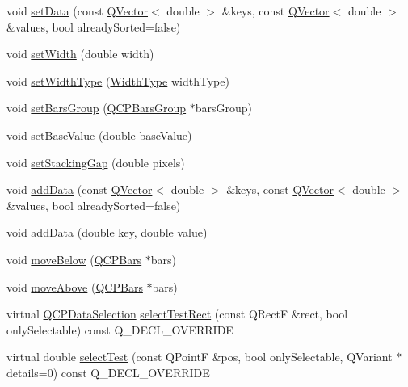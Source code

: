 \begin{DoxyCompactItemize}
\item 
void \hyperlink{class_q_c_p_bars_a2a88cd5b16ec7b71e5a590f95b50c5ce}{set\+Data} (const \hyperlink{class_q_vector}{Q\+Vector}$<$ double $>$ \&keys, const \hyperlink{class_q_vector}{Q\+Vector}$<$ double $>$ \&values, bool already\+Sorted=false)
\item 
void \hyperlink{class_q_c_p_bars_afec6116579d44d5b706e0fa5e5332507}{set\+Width} (double width)
\item 
void \hyperlink{class_q_c_p_bars_adcaa3b41281bb2c0f7949b341592fcc0}{set\+Width\+Type} (\hyperlink{class_q_c_p_bars_a65dbbf1ab41cbe993d71521096ed4649}{Width\+Type} width\+Type)
\item 
void \hyperlink{class_q_c_p_bars_aedd1709061f0b307c47ddb45e172ef9a}{set\+Bars\+Group} (\hyperlink{class_q_c_p_bars_group}{Q\+C\+P\+Bars\+Group} $\ast$bars\+Group)
\item 
void \hyperlink{class_q_c_p_bars_a574ec7eb7537566df1a28ff085d75623}{set\+Base\+Value} (double base\+Value)
\item 
void \hyperlink{class_q_c_p_bars_aeacf7561afb1c70284b22822b57c7bb5}{set\+Stacking\+Gap} (double pixels)
\item 
void \hyperlink{class_q_c_p_bars_a323d6970d6d6e3166d89916a7f60f733}{add\+Data} (const \hyperlink{class_q_vector}{Q\+Vector}$<$ double $>$ \&keys, const \hyperlink{class_q_vector}{Q\+Vector}$<$ double $>$ \&values, bool already\+Sorted=false)
\item 
void \hyperlink{class_q_c_p_bars_a684dd105403a5497fda42f2094fecbb7}{add\+Data} (double key, double value)
\item 
void \hyperlink{class_q_c_p_bars_a69fc371346980f19177c3d1ecdad78ee}{move\+Below} (\hyperlink{class_q_c_p_bars}{Q\+C\+P\+Bars} $\ast$bars)
\item 
void \hyperlink{class_q_c_p_bars_ac22e00a6a41509538c21b04f0a57318c}{move\+Above} (\hyperlink{class_q_c_p_bars}{Q\+C\+P\+Bars} $\ast$bars)
\item 
virtual \hyperlink{class_q_c_p_data_selection}{Q\+C\+P\+Data\+Selection} \hyperlink{class_q_c_p_bars_ab03bb6125c3e983b89d694f75ce6b3d5}{select\+Test\+Rect} (const Q\+RectF \&rect, bool only\+Selectable) const Q\+\_\+\+D\+E\+C\+L\+\_\+\+O\+V\+E\+R\+R\+I\+DE
\item 
virtual double \hyperlink{class_q_c_p_bars_a121f899c27af3186fe93dcd0eb98f49b}{select\+Test} (const Q\+PointF \&pos, bool only\+Selectable, Q\+Variant $\ast$details=0) const Q\+\_\+\+D\+E\+C\+L\+\_\+\+O\+V\+E\+R\+R\+I\+DE
\item 

\end{DoxyCompactItemize}
